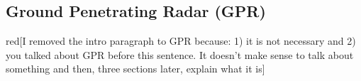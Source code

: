 \documentclass[5p]{elsarticle}
\newcommand{\alon}{\begin{color}{red}}
\newcommand{\aloff}{\end{color}}
\begin{document}



	\subsection{Ground Penetrating Radar (GPR)}
										
        \alon[I removed the intro paragraph to GPR because: 1) it is not necessary and 2) you talked about GPR before this sentence. It doesn't make sense to talk about something and then, three sections later, explain what it is]\aloff
\end{document}
